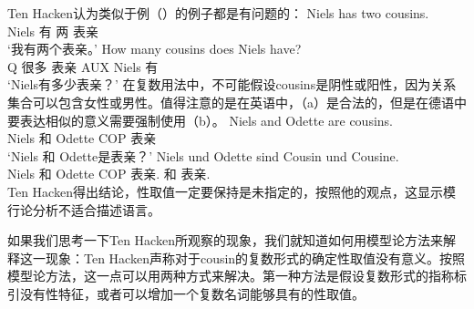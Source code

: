 \noindent
Ten Hacken认为类似于例（）的例子都是有问题的：
\eal
\ex 
\gll Niels has two cousins.\\
	 Niels 有 两 表亲\\
\glt `我有两个表亲。'
\ex 
\gll How many cousins does Niels have?\\
	Q 很多 表亲 AUX Niels 有\\
\glt `Niels有多少表亲？'
\zl
在复数用法中，不可能假设cousins是阴性或阳性，因为关系集合可以包含女性或男性。值得注意的是在英语中，（a）是合法的，但是在德语中要表达相似的意义需要强制使用（b）。
\eal
\ex 
\gll Niels and Odette are cousins.\\
	Niels 和 Odette COP 表亲\\
\glt `Niels 和 Odette是表亲？'
\ex 
\gll Niels und Odette sind Cousin und Cousine.\\
	 Niels 和 Odette COP 表亲.\mas{} 和 表亲.\fem\\
\zl
Ten Hacken得出结论，性取值一定要保持是未指定的，按照他的观点，这显示模行论分析不适合描述语言。

如果我们思考一下Ten Hacken所观察的现象，我们就知道如何用模型论方法来解释这一现象：Ten Hacken声称对于cousin的复数形式的确定性取值没有意义。按照模型论方法，这一点可以用两种方式来解决。第一种方法是假设复数形式的指称标引没有性特征，或者可以增加一个复数名词能够具有的性取值。

